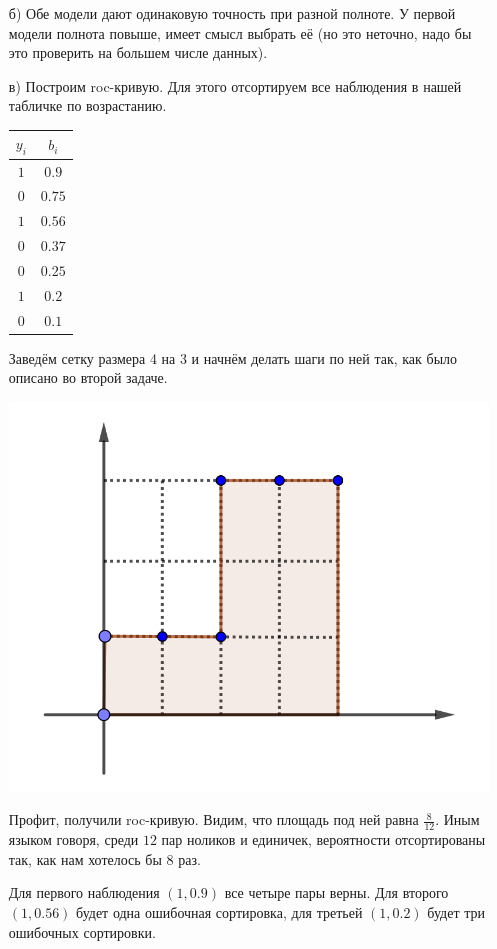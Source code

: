 \documentclass[12pt, a4paper, oneside]{article}
\theoremstyle{plain} %
\theoremstyle{definition}
\begin{document}
\begin{solution}
\begin{enumerate}
		\item[б)]  Обе модели дают одинаковую точность при разной полноте. У первой модели полнота повыше, имеет смысл выбрать её (но это неточно, надо бы это проверить на большем числе данных). 
		
		\item[в)] Построим roc-кривую. Для этого отсортируем все наблюдения в нашей табличке по возрастанию.
		
		\begin{center}
			\begin{tabular}{c|c}
				$y_i$ & $b_i$ \\
				\hline
				$1$  & $0.9$ \\
				$0$ & $0.75$ \\
				$1$ & $0.56$ \\
				$0$ & $0.37$ \\	
				$0$ & $0.25$ \\			
				$1$ & $0.2$ \\												
				$0$ & $0.1$ \\
			\end{tabular}
		\end{center}
		
		Заведём сетку размера 4 на 3 и начнём делать шаги по ней так, как было описано во второй задаче.
		
		\begin{center}
			\includegraphics[width=.4\paperwidth]{roc_auc2.png}
		\end{center}
		
		Профит, получили roc-кривую.  Видим, что площадь под ней равна $\frac{8}{12}$. Иным языком говоря, среди $12$ пар ноликов и единичек, вероятности отсортированы так, как нам хотелось бы $8$ раз. 
		
		Для первого наблюдения $(1, 0.9)$ все четыре пары верны. Для второго $(1, 0.56)$ будет одна ошибочная сортировка, для третьей $(1,0.2)$ будет три ошибочных сортировки. 
	\end{enumerate}
\end{solution}
\end{document}
